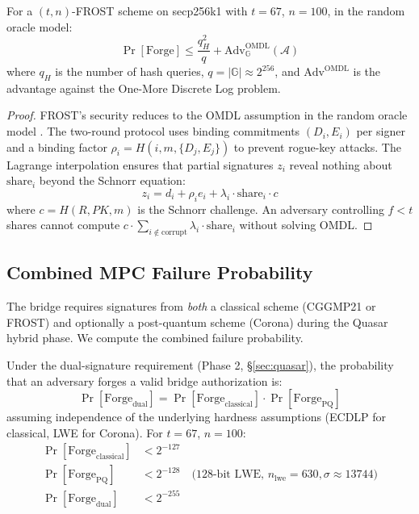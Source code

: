 \begin{theorem}
For a $(t, n)$-FROST scheme on secp256k1 with $t = 67$, $n = 100$, in the random oracle model:
\begin{equation}
\Pr[\text{Forge}] \leq \frac{q_H^2}{q} + \text{Adv}^{\text{OMDL}}_{\mathbb{G}}(\mathcal{A})
\end{equation}
where $q_H$ is the number of hash queries, $q = |\mathbb{G}| \approx 2^{256}$, and $\text{Adv}^{\text{OMDL}}$ is the advantage against the One-More Discrete Log problem.
\end{theorem}

\begin{proof}
FROST's security reduces to the OMDL assumption in the random oracle model \cite{frost}. The two-round protocol uses binding commitments $(D_i, E_i)$ per signer and a binding factor $\rho_i = H(i, m, \{D_j, E_j\})$ to prevent rogue-key attacks. The Lagrange interpolation ensures that partial signatures $z_i$ reveal nothing about $\text{share}_i$ beyond the Schnorr equation:
\begin{equation}
z_i = d_i + \rho_i e_i + \lambda_i \cdot \text{share}_i \cdot c
\end{equation}
where $c = H(R, PK, m)$ is the Schnorr challenge. An adversary controlling $f < t$ shares cannot compute $c \cdot \sum_{i \notin \text{corrupt}} \lambda_i \cdot \text{share}_i$ without solving OMDL.
\end{proof}

\subsection{Combined MPC Failure Probability}\label{subsec:combined-failure}

The bridge requires signatures from \emph{both} a classical scheme (CGGMP21 or FROST) and optionally a post-quantum scheme (Corona) during the Quasar hybrid phase. We compute the combined failure probability.

\begin{proposition}
Under the dual-signature requirement (Phase 2, \S\ref{sec:quasar}), the probability that an adversary forges a valid bridge authorization is:
\begin{equation}
\Pr[\text{Forge}_{\text{dual}}] = \Pr[\text{Forge}_{\text{classical}}] \cdot \Pr[\text{Forge}_{\text{PQ}}]
\end{equation}
assuming independence of the underlying hardness assumptions (ECDLP for classical, LWE for Corona). For $t = 67$, $n = 100$:
\begin{align}
\Pr[\text{Forge}_{\text{classical}}] &< 2^{-127} \\
\Pr[\text{Forge}_{\text{PQ}}] &< 2^{-128} \quad \text{(128-bit LWE, } n_{\text{lwe}} = 630, \sigma \approx 13744\text{)} \\
\Pr[\text{Forge}_{\text{dual}}] &< 2^{-255}
\end{align}
\end{proposition}

